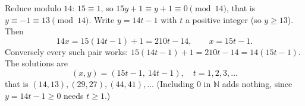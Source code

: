 Reduce modulo $14$: $15\equiv1$, so $15y+1\equiv y+1\equiv0\pmod{14}$, that is $y\equiv-1\equiv13\pmod{14}$. Write $y=14t-1$ with $t$ a positive integer (so $y\ge13$). Then
\[
14x=15(14t-1)+1=210t-14,\qquad x=15t-1 .
\]
Conversely every such pair works: $15(14t-1)+1=210t-14=14(15t-1)$. The solutions are
\[
\boxed{(x,y)=(15t-1,\ 14t-1),\quad t=1,2,3,\dots}
\]
that is $(14,13),(29,27),(44,41),\dots$ (Including $0$ in $\mathbb{N}$ adds nothing, since $y=14t-1\ge0$ needs $t\ge1$.)
